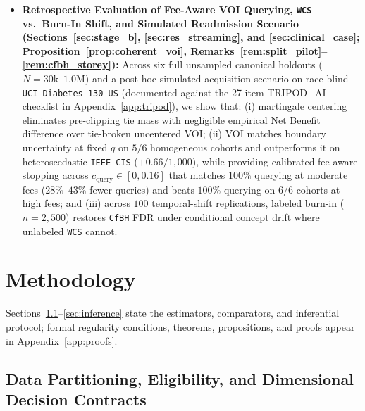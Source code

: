 \documentclass[11pt]{article}
\theoremstyle{remark}
\begin{document}
\begin{itemize}
  \item \textbf{Retrospective Evaluation of Fee-Aware VOI Querying, \texttt{WCS} vs.\ Burn-In Shift, and Simulated Readmission Scenario (Sections~\ref{sec:stage_b}, \ref{sec:res_streaming}, and \ref{sec:clinical_case}; Proposition~\ref{prop:coherent_voi}, Remarks~\ref{rem:split_pilot}--\ref{rem:cfbh_storey}):} Across six full unsampled canonical holdouts ($N = 30\text{k}\text{--}1.0\text{M}$) and a post-hoc simulated acquisition scenario on race-blind \texttt{UCI Diabetes 130-US} (documented against the 27-item TRIPOD+AI checklist in Appendix~\ref{app:tripod}), we show that: (i) martingale centering eliminates pre-clipping tie mass with negligible empirical Net Benefit difference over tie-broken uncentered VOI; (ii) VOI matches boundary uncertainty at fixed $q$ on $5/6$ homogeneous cohorts and outperforms it on heteroscedastic \texttt{IEEE-CIS} ($+0.66/1{,}000$), while providing calibrated fee-aware stopping across $c_{\text{query}} \in [0, 0.16]$ that matches $100\%$ querying at moderate fees ($28\%\text{--}43\%$ fewer queries) and beats $100\%$ querying on $6/6$ cohorts at high fees; and (iii) across $100$ temporal-shift replications, labeled burn-in ($n = 2{,}500$) restores \texttt{CfBH} FDR under conditional concept drift where unlabeled \texttt{WCS} \citep{jin2025wcs} cannot.
\end{itemize}

\section{Methodology}
\label{sec:methods}

Sections~\ref{sec:setup}--\ref{sec:inference} state the estimators, comparators, and inferential protocol; formal regularity conditions, theorems, propositions, and proofs appear in Appendix~\ref{app:proofs}.

\subsection{Data Partitioning, Eligibility, and Dimensional Decision Contracts}
\label{sec:setup}
\end{document}
